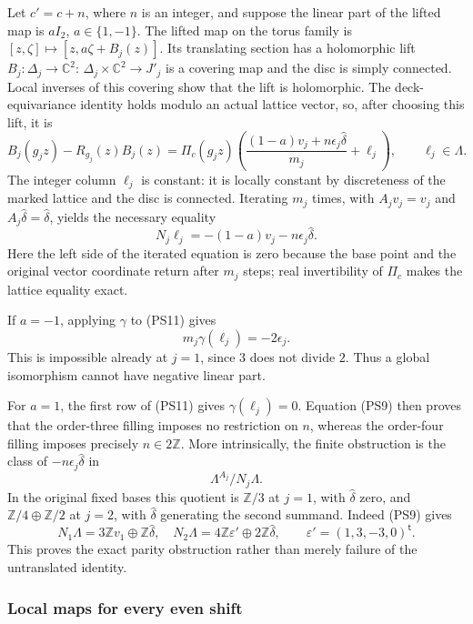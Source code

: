 \documentclass[11pt,a4paper]{article}
\theoremstyle{plain}
\theoremstyle{definition}
\begin{document}
Let $c'=c+n$, where $n$ is an integer, and suppose the linear part of
the lifted map is $aI_2$, $a\in\{1,-1\}$. The lifted map on the torus
family is $[z,\zeta]\mapsto[z,a\zeta+B_j(z)]$. Its translating
section has a holomorphic lift $B_j:\Delta_j\to\mathbb C^2$:
$\Delta_j\times\mathbb C^2\to J'_j$ is a covering map and the disc is
simply connected. Local inverses of this covering show that the lift
is holomorphic. The deck-equivariance identity holds modulo an
actual lattice vector, so, after choosing this lift, it is
\[
 B_j(g_jz)-R_{g_j}(z)B_j(z)
  =\Pi_c(g_jz)\left(
       \frac{(1-a)v_j+n\epsilon_j\widehat\delta}{m_j}
          +\ell_j\right),\qquad \ell_j\in\Lambda.
 \tag{PS10}\label{pshift:eq:finite-equation}
\]
The integer column $\ell_j$ is constant: it is locally constant by
discreteness of the marked lattice and the disc is connected.
Iterating $m_j$ times, with $A_jv_j=v_j$ and
$A_j\widehat\delta=\widehat\delta$, yields the necessary equality
\[
 N_j\ell_j=-(1-a)v_j-n\epsilon_j\widehat\delta.
 \tag{PS11}\label{pshift:eq:finite-norm-obstruction}
\]
Here the left side of the iterated equation is zero because the
base point and the original vector coordinate return after $m_j$
steps; real invertibility of $\Pi_c$ makes the lattice equality exact.

If $a=-1$, applying $\gamma$ to (PS11) gives
\[
                   m_j\gamma(\ell_j)=-2\epsilon_j.
\]
This is impossible already at $j=1$, since $3$ does not divide $2$.
Thus a global isomorphism cannot have negative linear part.

For $a=1$, the first row of (PS11) gives $\gamma(\ell_j)=0$.
Equation (PS9) then proves that the order-three filling imposes no
restriction on $n$, whereas the order-four filling imposes precisely
$n\in2\mathbb Z$. More intrinsically, the finite obstruction is the
class of $-n\epsilon_j\widehat\delta$ in
\[
 \Lambda^{A_j}/N_j\Lambda.
 \tag{PS12}\label{pshift:eq:finite-class}
\]
In the original fixed bases this quotient is
$\mathbb Z/3$ at $j=1$, with $\widehat\delta$ zero, and
$\mathbb Z/4\oplus\mathbb Z/2$ at $j=2$, with
$\widehat\delta$ generating the second summand. Indeed (PS9) gives
\[
 N_1\Lambda=3\mathbb Z v_1\oplus\mathbb Z\widehat\delta,
 \quad
 N_2\Lambda=4\mathbb Z\varepsilon'\oplus
                      2\mathbb Z\widehat\delta,
 \qquad \varepsilon'=(1,3,-3,0)^{\mathsf t}.
\]
This proves the exact parity obstruction rather than merely failure
of the untranslated identity.

\subsubsection{Local maps for every even shift}
\end{document}
